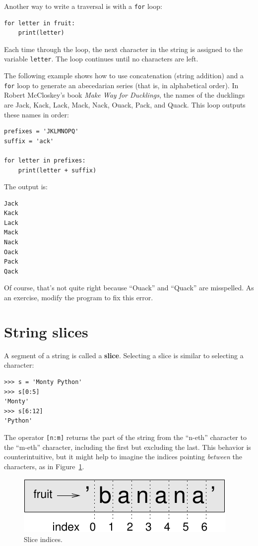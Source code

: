 \documentclass[10pt]{book}
\begin{document}
Another way to write a traversal is with a {\tt for} loop:

\begin{verbatim}
for letter in fruit:
    print(letter)
\end{verbatim}
%
Each time through the loop, the next character in the string is assigned
to the variable {\tt letter}.  The loop continues until no characters are
left.

The following example shows how to use concatenation (string addition)
and a {\tt for} loop to generate an abecedarian series (that is, in
alphabetical order).  In Robert McCloskey's book {\em Make
Way for Ducklings}, the names of the ducklings are Jack, Kack, Lack,
Mack, Nack, Ouack, Pack, and Quack.  This loop outputs these names in
order:

\begin{verbatim}
prefixes = 'JKLMNOPQ'
suffix = 'ack'

for letter in prefixes:
    print(letter + suffix)
\end{verbatim}
%
The output is:

\begin{verbatim}
Jack
Kack
Lack
Mack
Nack
Oack
Pack
Qack
\end{verbatim}
%
Of course, that's not quite right because ``Ouack'' and ``Quack'' are
misspelled.  As an exercise, modify the program to fix this error.



\section{String slices}
\label{slice}
  
 

A segment of a string is called a {\bf slice}.  Selecting a slice is
similar to selecting a character:

\begin{verbatim}
>>> s = 'Monty Python'
>>> s[0:5]
'Monty'
>>> s[6:12]
'Python'
\end{verbatim}
%
The operator {\tt [n:m]} returns the part of the string from the 
``n-eth'' character to the ``m-eth'' character, including the first but
excluding the last.  This behavior is counterintuitive, but it might
help to imagine the indices pointing {\em between} the
characters, as in Figure~\ref{fig.banana}.

\begin{figure}
\centerline
{\includegraphics[scale=0.8]{figs/banana.pdf}}
\caption{Slice indices.}
\label{fig.banana}
\end{figure}
\end{document}
